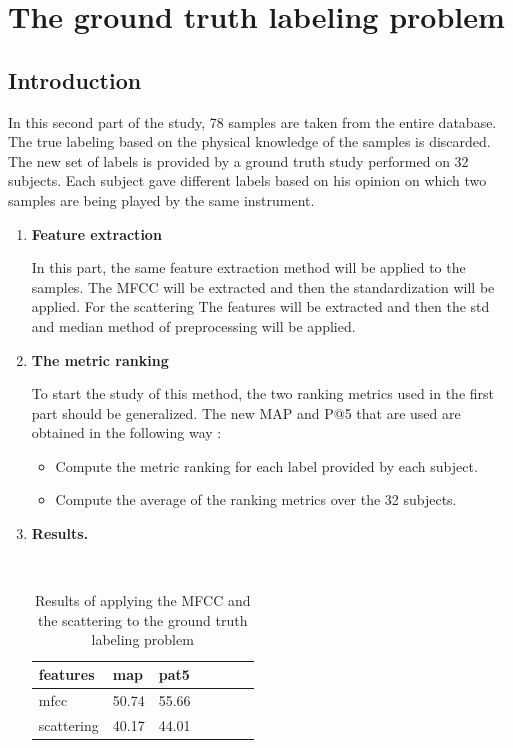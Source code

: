 \documentclass[hidelinks,12pt]{report}
\begin{document}
\chapter{The ground truth labeling problem}
\section{Introduction}
In this second part of the study, 78 samples are taken from the entire database. The true labeling based on the physical knowledge of the samples is discarded. The new set of labels is provided by a ground truth study performed on 32 subjects. Each subject gave different labels based on his opinion on which two samples are being played by the same instrument. \par
\begin{enumerate}
\item \textbf{Feature extraction} \par
In this part, the same feature extraction method will be applied to the samples. The MFCC will be extracted and then the standardization will be applied. For the scattering The features will be extracted and then the std and median method of preprocessing will be applied.




\item \textbf{The metric ranking} \par
To start the study of this method, the two ranking metrics used in the first part should be generalized. The new MAP and P@5 that are used are obtained in the following way :
 \begin{itemize}
\item Compute the metric ranking for each label provided by each subject.
\item Compute the average of the ranking metrics over the 32 subjects.
\end{itemize}


\item \textbf{Results.}

\begin{table}[H]
\begin{center} 
\ 
 \setlength{\tabcolsep}{.16667em} 
\begin{tabular}{ | l | l | l | l | l | l | l |} 
\hline
features & map & pat5 \\ 
\hline 
mfcc &  50.74  & 55.66 \\ 
scattering & 40.17 & 44.01  \\ 
\hline
\end{tabular} 
\end{center} 
\caption{Results of applying the MFCC and the scattering to the ground truth labeling problem} 
\label{ground truth} 
\end{table}
\end{enumerate}
\end{document}
